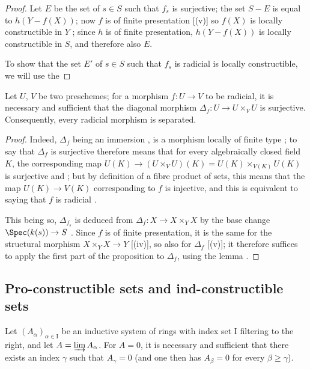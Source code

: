 \begin{proof}
Let $E$ be the set of $s\in S$ such that $f_s$ is surjective; the set $S-E$ is equal to $h(Y-f(X))$; now $f$ is of finite presentation [(v)] so $f(X)$ is locally constructible in $Y$ ; since $h$ is of finite presentation, $h(Y-f(X))$ is locally constructible in $S$, and therefore also $E$.

To show that the set $E'$ of $s\in S$ such that $f_s$ is radicial is locally constructible, we will use the
\end{proof}

\begin{lemma}[1.8.7.1]
\label{IV.1.8.7.1}
Let $U$, $V$ be two preschemes; for a morphism $f:U\to V$ to be radicial, it is necessary and sufficient that the diagonal morphism $\Delta_f:U\to U\times_V U$ is surjective.
Consequently, every radicial morphism is separated.
\end{lemma}

\begin{proof}
Indeed, $\Delta_f$ being an immersion , is a morphism locally of finite type ; to say that $\Delta_f$ is surjective therefore means that for every algebraically closed field $K$, the corresponding map $U(K)\to(U\times_V U)(K)=U(K)\times_{V(K)} U(K)$ is surjective  and ; but by definition of a fibre product of sets, this means that the map $U(K)\to V(K)$ corresponding to $f$ is injective, and this is equivalent to saying that $f$ is radicial .

This being so, $\Delta_{f_s}$ is deduced from $\Delta_f:X\to X\times_Y X$ by the base change $\Spec(k(s))\to S$ .
Since $f$ is of finite presentation, it is the same for the structural morphism $X\times_Y X\to Y$ [(iv)], so also for $\Delta_f$ [(v)]; it therefore suffices to apply the first part of the proposition to $\Delta_f$, using the lemma .
\end{proof}

\subsection{Pro-constructible sets and ind-constructible sets}
\label{subsection:IV.1.9}

\begin{lemma}[1.9.1]
\label{IV.1.9.1}
Let $(A_\alpha)_{\alpha\in\mathrm{I}}$ be an inductive system of rings with index set $\mathrm{I}$ filtering to the right, and let $A=\varinjlim A_\alpha$.
For $A=0$, it is necessary and sufficient that there exists an index $\gamma$ such that $A_\gamma=0$ (and one then has $A_\beta=0$ for every $\beta\geq\gamma$).
\end{lemma}

